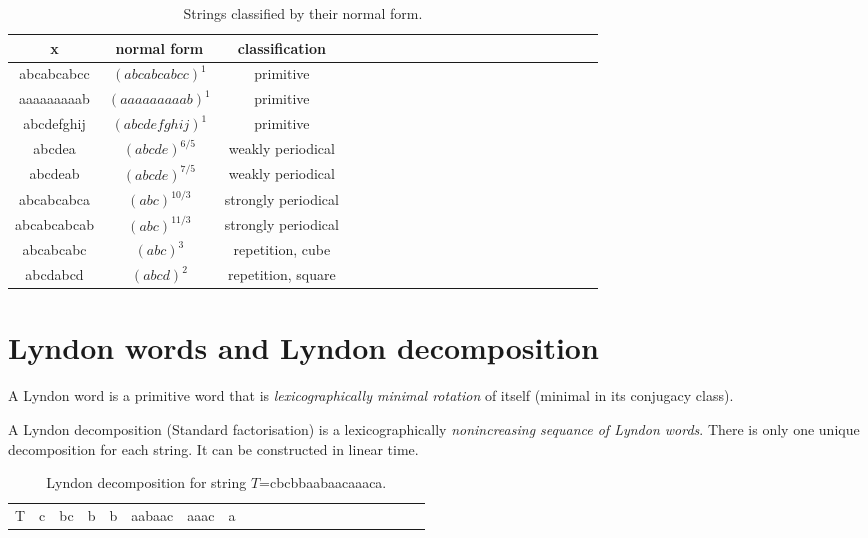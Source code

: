 \begin{table}[h]
  \begin{center}
    \begin{tabular}{c|cccccccccccccccccccc}
      x & normal form & classification\\
      \hline
      abcabcabcc & $(abcabcabcc)^1$ & primitive\\
      aaaaaaaaab & $(aaaaaaaaab)^1$ & primitive\\
      abcdefghij & $(abcdefghij)^1$ & primitive\\
      abcdea & $(abcde)^{6/5}$ & weakly periodical\\
      abcdeab & $(abcde)^{7/5}$ & weakly periodical\\
      abcabcabca & $(abc)^{10/3}$ & strongly periodical\\
      abcabcabcab & $(abc)^{11/3}$ & strongly periodical\\
      abcabcabc & $(abc)^3$ & repetition, cube\\
      abcdabcd & $(abcd)^2$ & repetition, square\\
    \end{tabular}
  \end{center}
  \caption{Strings classified by their normal form.}
\end{table}

\section{Lyndon words and Lyndon decomposition}

\begin{dt}{A Lyndon word}
  is a primitive word that is \emph{lexicographically minimal rotation} of itself (minimal in its conjugacy class).
\end{dt}

\begin{dt}{A Lyndon decomposition (Standard factorisation)}
  is a lexicographically \emph{nonincreasing sequance of Lyndon words}. There is only one unique decomposition for each string. It can be constructed in linear time.
\end{dt}

\begin{table}[h]
  \footnotesize
  \begin{tabular}{c|cccccccccccccccccccc}
    T & c & bc &b &b & aabaac & aaac & a 
  \end{tabular}
  \caption{Lyndon decomposition for string $T$=cbcbbaabaacaaaca.}
\end{table}

